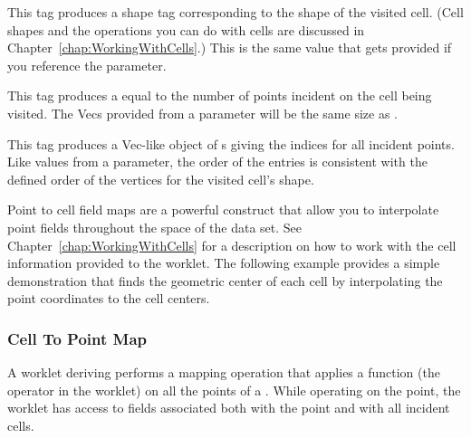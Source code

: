 \begin{description}
  \numericexecutionsignaturetags

\item[\sigtag{CellShape}] This tag produces a shape tag corresponding to
  the shape of the visited cell. (Cell shapes and the operations you can do
  with cells are discussed in
  Chapter~\ref{chap:WorkingWithCells}.) This is the
  same value that gets provided if you reference the
   parameter.

\item[\sigtag{PointCount}] This tag produces a  equal to
  the number of points incident on the cell being visited. The Vecs
  provided from a  parameter will be the same
  size as .

\item[\sigtag{PointIndices}] This tag produces a Vec-like object of
  s giving the indices for all incident points. Like values from a
   parameter, the order of the entries is
  consistent with the defined order of the vertices for the visited cell's
  shape.

  \commonexecutionsignaturetags
\end{description}

Point to cell field maps are a powerful construct that allow you to interpolate point fields throughout the space of the data set.
See Chapter~\ref{chap:WorkingWithCells} for a description on how to work with the cell information provided to the worklet.
The following example provides a simple demonstration that finds the geometric center of each cell by interpolating the point coordinates to the cell centers.



\subsubsection{Cell To Point Map}
\label{sec:WorkletMapCellToPoint}


A worklet deriving  performs a mapping
operation that applies a function (the operator in the worklet) on all the
points of a . While operating on the point, the
worklet has access to fields associated both with the point and with all
incident cells.

